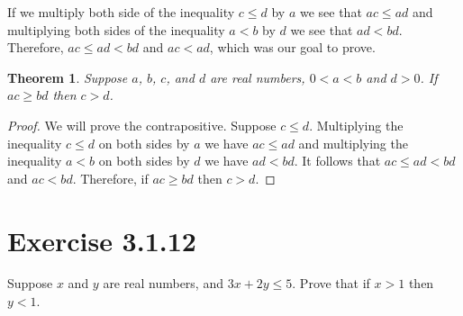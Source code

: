 \documentclass{article}
\newcommand{\n}{ \noindent }
\newtheorem*{theorem}{Theorem}  %
\begin{document}
\n If we multiply both side of the inequality $c \leq d$ by $a$ we see that $ac \leq ad$ and multiplying both sides of the inequality $a < b$ by $d$ we see that $ad < bd$. Therefore, $ac \leq ad < bd$ and $ac < ad$, which was our goal to prove.

\begin{theorem} Suppose $a$, $b$, $c$, and $d$ are real numbers, $0<a<b$ and $d>0$. If $ac \geq bd$ then $c>d$.
\end{theorem}
\begin{proof}
We will prove the contrapositive. Suppose $c \leq d$. Multiplying the inequality $c \leq d$ on both sides by $a$ we have $ac \leq ad$ and multiplying the inequality $a<b$ on both sides by $d$ we have $ad < bd$. It follows that $ac \leq ad < bd$ and $ac < bd$. Therefore, if $ac \geq bd$ then $c>d$.
\end{proof}

\section*{Exercise 3.1.12}
Suppose $x$ and $y$ are real numbers, and $3x + 2y \leq 5$. Prove that if $x>1$ then $y<1$.
\end{document}
